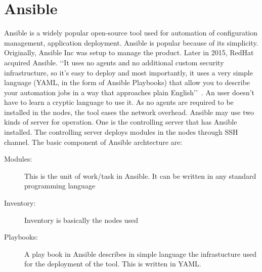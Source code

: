 \section{Ansible}
Ansible is a widely popular open-source tool used for automation of
configuration management, application deployment. Ansible is popular
because of its simplicity. Originally, Ansible Inc was setup to
manage the product. Later in 2015, RedHat acquired Ansible.
‘‘It uses no agents and no additional custom security infrastructure,
so it’s easy to deploy and most importantly, it uses a very simple
language (YAML, in the form of Ansible Playbooks) that allow you to
describe your automation jobs in a way that approaches plain
English’’~\cite{hid-sp18-417-doc-Ansible}.
An user doesn’t have to learn a cryptic language to use it.  As no
agents are required to be installed in the nodes, the tool eases the
network overhead. Ansible may use two kinds of server for operation. One is the
controlling server that has Ansible installed.  The controlling server
deploys modules in the nodes through SSH channel.
The basic component of Ansible archtecture are: 
\begin{description}
\item[Modules:] This is the unit of work/task in Ansible. It
  can be written in any standard programming language
\item[Inventory:] Inventory is basically the nodes used
\item[Playbooks:] A play book in Ansible describes in simple
  language the infrastucture used for the deployment of the tool. This
  is written in YAML. 
\end{description}
